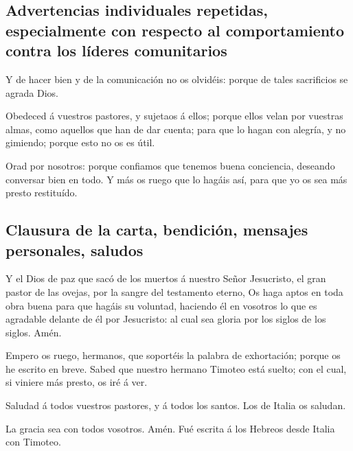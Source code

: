 \hypertarget{advertencias-individuales-repetidas-especialmente-con-respecto-al-comportamiento-contra-los-luxedderes-comunitarios}{%
\subsection{Advertencias individuales repetidas, especialmente con
respecto al comportamiento contra los líderes
comunitarios}\label{advertencias-individuales-repetidas-especialmente-con-respecto-al-comportamiento-contra-los-luxedderes-comunitarios}}

 Y de hacer bien y de la comunicación no os olvidéis:
porque de tales sacrificios se agrada Dios.

 Obedeced á vuestros pastores, y sujetaos á ellos; porque
ellos velan por vuestras almas, como aquellos que han de dar cuenta;
para que lo hagan con alegría, y no gimiendo; porque esto no os es útil.

 Orad por nosotros: porque confiamos que tenemos buena
conciencia, deseando conversar bien en todo.  Y más os
ruego que lo hagáis así, para que yo os sea más presto restituído.

\hypertarget{clausura-de-la-carta-bendiciuxf3n-mensajes-personales-saludos}{%
\subsection{Clausura de la carta, bendición, mensajes personales,
saludos}\label{clausura-de-la-carta-bendiciuxf3n-mensajes-personales-saludos}}

 Y el Dios de paz que sacó de los muertos á nuestro Señor
Jesucristo, el gran pastor de las ovejas, por la sangre del testamento
eterno,  Os haga aptos en toda obra buena para que hagáis
su voluntad, haciendo él en vosotros lo que es agradable delante de él
por Jesucristo: al cual sea gloria por los siglos de los siglos. Amén.

 Empero os ruego, hermanos, que soportéis la palabra de
exhortación; porque os he escrito en breve.  Sabed que
nuestro hermano Timoteo está suelto; con el cual, si viniere más presto,
os iré á ver.

 Saludad á todos vuestros pastores, y á todos los santos.
Los de Italia os saludan.

 La gracia sea con todos vosotros. Amén. Fué escrita á los
Hebreos desde Italia con Timoteo.
